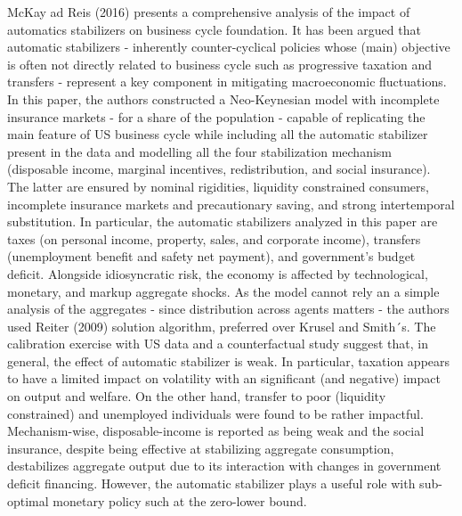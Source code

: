 \documentclass[12pt,a4paper]{article}
\begin{document}
McKay ad Reis (2016) presents a comprehensive analysis of the impact of automatics stabilizers on business cycle foundation. It has  been argued that automatic stabilizers - inherently counter-cyclical policies whose (main) objective is often not directly related to business cycle such as progressive taxation and transfers - represent a key component in mitigating macroeconomic fluctuations. In this paper, the authors constructed a Neo-Keynesian model with incomplete insurance markets - for a share of the population - capable of replicating the main feature of US business cycle while including all the automatic stabilizer present in the data and modelling all the four stabilization mechanism (disposable income, marginal incentives, redistribution, and social insurance). The latter are ensured by nominal rigidities, liquidity constrained consumers, incomplete insurance markets and precautionary saving, and strong intertemporal substitution. In particular, the automatic stabilizers analyzed in this paper are taxes (on personal income, property, sales, and corporate income), transfers (unemployment benefit and safety net payment), and government's budget deficit. Alongside idiosyncratic risk, the economy is affected by technological, monetary, and markup aggregate shocks. As the model cannot rely an a simple analysis of the aggregates - since distribution across agents matters - the authors used Reiter (2009) solution algorithm, preferred over Krusel and Smith´s. The calibration exercise with US data and a counterfactual study suggest that, in general, the effect of automatic stabilizer is weak. In particular, taxation appears to have a limited impact on volatility with an significant (and negative) impact on output and welfare. On the other hand, transfer to poor (liquidity constrained) and unemployed individuals were found to be rather impactful. Mechanism-wise, disposable-income is reported as being weak and the social insurance, despite being effective at stabilizing aggregate consumption, destabilizes aggregate output due to its interaction with changes in government deficit financing. However, the automatic stabilizer plays a useful role with sub-optimal monetary policy such at the zero-lower bound.

%
\pagebreak
\end{document}
